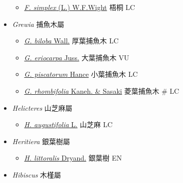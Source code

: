 \begin{itemize}
  \begin{itemize}
        \item[] \href{http://www.theplantlist.org/tpl1.1/search?q=Firmiana+simplex}{\textit{F. simplex} (L.) W.F.Wight}   梧桐   LC
  \end{itemize}
 \item[] \textit{Grewia} 捕魚木屬
                                
  \begin{itemize}
        \item[] \href{http://www.theplantlist.org/tpl1.1/search?q=Grewia+biloba}{\textit{G. biloba} Wall.}   厚葉捕魚木   LC
        \item[] \href{http://www.theplantlist.org/tpl1.1/search?q=Grewia+eriocarpa}{\textit{G. eriocarpa} Juss.}   大葉捕魚木   VU
        \item[] \href{http://www.theplantlist.org/tpl1.1/search?q=Grewia+piscatorum}{\textit{G. piscatorum} Hance}   小葉捕魚木   LC
        \item[] \href{http://www.theplantlist.org/tpl1.1/search?q=Grewia+rhombifolia}{\textit{G. rhombifolia} Kaneh. \& Sasaki}   菱葉捕魚木  \# LC
  \end{itemize}
 \item[] \textit{Helicteres} 山芝麻屬
                                
  \begin{itemize}
        \item[] \href{http://www.theplantlist.org/tpl1.1/search?q=Helicteres+augustifolia}{\textit{H. augustifolia} L.}   山芝麻   LC
  \end{itemize}
 \item[] \textit{Heritiera} 銀葉樹屬
                                
  \begin{itemize}
        \item[] \href{http://www.theplantlist.org/tpl1.1/search?q=Heritiera+littoralis}{\textit{H. littoralis} Dryand.}   銀葉樹   EN
  \end{itemize}
 \item[] \textit{Hibiscus} 木槿屬
                                

\end{itemize}
